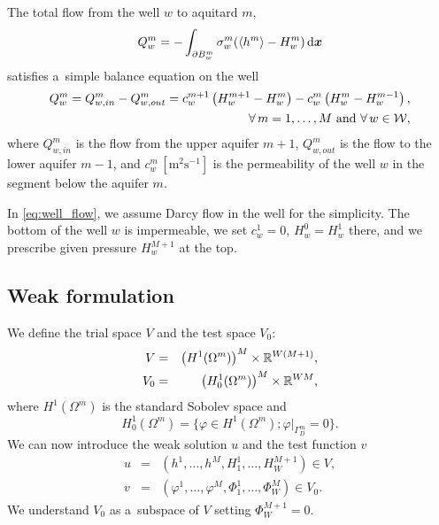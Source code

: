 \documentclass[FM,Dis]{tulthesis}
\begin{document}
The total flow from the well $w$ to aquitard $m$,
\[
    Q^m_w =-\int_{\partial B^m_w} \sigma^m_w(\langle h^m \rangle - H^m_w)  \,{\rm d}\mathbf{\boldsymbol{x}}
\]
satisfies a~simple balance equation on the well
\begin{align}
    \label{eq:well_flow}
    Q_w^m = Q^m_{w,in} - Q^m_{w,out} = c^{m+1}_w\left( H^{m+1}_w-H^m_w \right) - c_w^m\left( H^m_w-H_w^{m-1}\right),&\\
    \notag
    \forall\,m=1,\dots,M\text{ and }\forall\,w\in\mathcal{W},&
\end{align}
where $Q^m_{w,in}$ is the flow from the upper aquifer $m+1$, $Q^m_{w,out}$ is the flow to the lower aquifer $m-1$, and 
$c^m_w\, [\textrm{m}^2\textrm{s}^{-1}]$ is the permeability of the well $w$ in the segment below the aquifer $m$.

%
In \eqref{eq:well_flow}, we assume Darcy flow in the well for the simplicity. The bottom of the well $w$ is impermeable,
we set $c^1_w=0$, $H^0_w=H^1_w$ there, and we prescribe given pressure $H^{M+1}_w$ at the top.


\subsection{Weak formulation}
We define the trial space $V$ and the test space $V_0$:
\begin{eqnarray} \label{eqn:spaces}
  V &=& \left(H^1(\Omega^m)\right)^M\times{\mathbb{R}}^{W(M+1)}, \\
  V_0 &=& \left(H^1_0(\Omega^m)\right)^M\times{\mathbb{R}}^{WM},
\end{eqnarray}
where $H^1(\Omega^m)$ is the standard Sobolev space and 
\[ H^1_0(\Omega^m)=\{\varphi\in H^1(\Omega^m); \varphi|_{\Gamma^m_D}=0\}. \]
We can now introduce the weak solution $u$ and the test function $v$
\begin{eqnarray} \label{eqn:solution}
   u &=& (h^1,\ldots, h^M, H^1_1,\ldots,H^{M+1}_W)\in V, \\
   v &=& (\varphi^1,\ldots, \varphi^M, \Phi^1_1,\ldots,\Phi^M_W)\in V_0.
\end{eqnarray}
We understand $V_0$ as a~subspace of $V$ setting $\Phi^{M+1}_W=0$.
\end{document}
